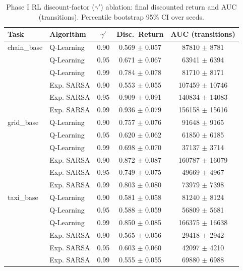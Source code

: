 \begin{table}[t]
\centering
\caption{Phase I RL discount-factor ($\gamma'$) ablation: final discounted return and AUC (transitions). Percentile bootstrap 95\% CI over seeds.}
\label{tab:p1d-rl}
\begin{tabular}{llccc}
\toprule
Task & Algorithm & $\gamma'$ & Disc.\ Return & AUC (transitions) \\
\midrule
  chain\_base & Q-Learning & 0.90 & 0.569 $\pm$ 0.057 & 87810 $\pm$ 8781 \\
   & Q-Learning & 0.95 & 0.671 $\pm$ 0.067 & 63941 $\pm$ 6394 \\
   & Q-Learning & 0.99 & 0.784 $\pm$ 0.078 & 81710 $\pm$ 8171 \\
   & Exp. SARSA & 0.90 & 0.553 $\pm$ 0.055 & 107459 $\pm$ 10746 \\
   & Exp. SARSA & 0.95 & 0.909 $\pm$ 0.091 & 140834 $\pm$ 14083 \\
   & Exp. SARSA & 0.99 & 0.936 $\pm$ 0.079 & 156158 $\pm$ 15616 \\
  grid\_base & Q-Learning & 0.90 & 0.757 $\pm$ 0.076 & 91648 $\pm$ 9165 \\
   & Q-Learning & 0.95 & 0.620 $\pm$ 0.062 & 61850 $\pm$ 6185 \\
   & Q-Learning & 0.99 & 0.698 $\pm$ 0.070 & 37137 $\pm$ 3714 \\
   & Exp. SARSA & 0.90 & 0.872 $\pm$ 0.087 & 160787 $\pm$ 16079 \\
   & Exp. SARSA & 0.95 & 0.749 $\pm$ 0.075 & 49669 $\pm$ 4967 \\
   & Exp. SARSA & 0.99 & 0.803 $\pm$ 0.080 & 73979 $\pm$ 7398 \\
  taxi\_base & Q-Learning & 0.90 & 0.581 $\pm$ 0.058 & 81240 $\pm$ 8124 \\
   & Q-Learning & 0.95 & 0.588 $\pm$ 0.059 & 56809 $\pm$ 5681 \\
   & Q-Learning & 0.99 & 0.850 $\pm$ 0.085 & 166375 $\pm$ 16638 \\
   & Exp. SARSA & 0.90 & 0.565 $\pm$ 0.056 & 29418 $\pm$ 2942 \\
   & Exp. SARSA & 0.95 & 0.603 $\pm$ 0.060 & 42097 $\pm$ 4210 \\
   & Exp. SARSA & 0.99 & 0.555 $\pm$ 0.055 & 69880 $\pm$ 6988 \\
\bottomrule
\end{tabular}
\end{table}
